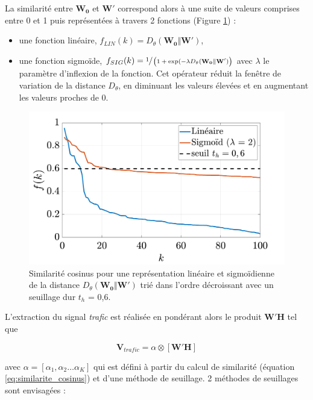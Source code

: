 La similarité entre $\mathbf{W_0}$ et $\mathbf{W'}$ correspond alors à une suite de valeurs comprises entre 0 et 1 puis représentées à travers 2 fonctions (Figure \ref{fig:resume_simil}) :

\begin{itemize}
\item une fonction linéaire, $f_{LIN}(k) = D_{\theta}(\mathbf{W_0} \Vert \mathbf{W'})$,
\item une fonction sigmoïde, $f_{SIG}(k) = \sfrac{1}{\left(1+\exp({-\lambda D_{\theta}(\mathbf{W_0} \Vert \mathbf{W'})}\right)}$ avec $\lambda$ le paramètre d'inflexion de la fonction. Cet opérateur réduit la fenêtre de variation de la distance $D_{\theta}$, en diminuant les valeurs élevées et en augmentant les valeurs proches de 0.\\
\end{itemize}

\begin{figure}
    \centering
    \includegraphics[width=0.7\linewidth]{./figures/NMF/lin_sig.pdf}
    \caption{Similarité cosinus pour une représentation linéaire et sigmoïdienne de la distance $D_{\theta}(\mathbf{W_0} \Vert \mathbf{W'})$ trié dans l'ordre décroissant avec un seuillage dur $t_h$ = 0,6. }
    \label{fig:resume_simil}
\end{figure}

L'extraction du signal \textit{trafic} est réalisée en pondérant alors le produit $\mathbf{W'H}$ tel que

\begin{equation}
\mathbf{V}_{trafic} = \alpha \otimes \left[\mathbf{W'H} \right]
\end{equation}

avec $\alpha = \left[\alpha_1, \alpha_2 \dots \alpha_K \right]$ qui est défini à partir du calcul de similarité (équation \ref{eq:similarite_cosinus}) et d'une méthode de seuillage. 2 méthodes de seuillages sont envisagées :

